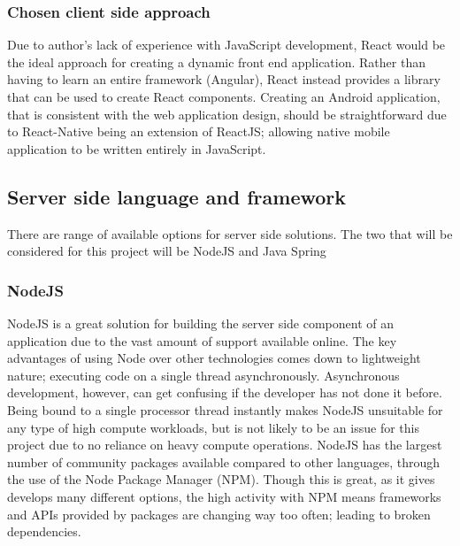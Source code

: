 \subsubsection*{Chosen client side approach} \label{chosenclientside}
Due to author's lack of experience with JavaScript development, React would be the ideal approach for creating a dynamic front end application.
Rather than having to learn an entire framework (Angular), React instead provides a library that can be used to create React components.
Creating an Android application, that is consistent with the web application design, should be straightforward due to React-Native
being an extension of ReactJS; allowing native mobile application to be written entirely in JavaScript.


\subsection{Server side language and framework}
There are range of available options for server side solutions.
The two that will be considered for this project will be NodeJS and Java Spring 

\subsubsection*{NodeJS}
NodeJS is a great solution for building the server side component of an application due to the vast amount of support available online.
The key advantages of using Node over other technologies comes down to lightweight nature; executing code on a single thread asynchronously.
Asynchronous development, however, can get confusing if the developer has not done it before.
Being bound to a single processor thread instantly makes NodeJS unsuitable for any type of high compute workloads, but is not likely to be an 
issue for this project due to no reliance on heavy compute operations.
NodeJS has the largest number of community packages available compared to other languages, through the use of the Node Package Manager (NPM).
Though this is great, as it gives develops many different options, the high activity with NPM means frameworks and APIs provided by packages
are changing way too often; leading to broken dependencies.


